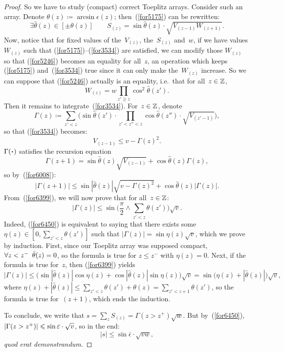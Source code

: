 \begin{proof}
So we have to study (compact) correct Toeplitz arrays.
Consider such an array.
Denote $\theta(z) \coloneqq \arcsin \epsilon(z)$;
then~(\ref{for5175}) can be rewritten:
\[\label{f7312} \exists \hat{\theta}(z) \in [\pm\theta(z)] \qquad
S_{(z)} = \sin \hat{\theta}(z) \cdot \sqrt{V_{(z-1)}W_{(z+1)}} .\]
%
Now, notice that for fixed values of the~$V_{(z)}$, the~$S_{(z)}$ and~$w$,
if we have values $W_{(z)}$ such that (\ref{for5175})--(\ref{for3534}) are satisfied,
we can modify those $W_{(z)}$ so that (\ref{for5246}) becomes an equality for all~$z$,
an operation which keeps (\ref{for5175}) and~(\ref{for3534}) true
since it can only make the~$W_{(z)}$ increase.
So we can suppose that (\ref{for5246}) actually is an equality,
i.e.\ that for all~$z\in\mathbb{Z}$,
\[\label{for5357} W_{(z)} = w \prod_{z'\geq z} \cos^2\hat{\theta}(z') .\]
%
Then it remains to integrate~(\ref{for3534}).
For~$z\in\mathbb{Z}$, denote
\[ \Gamma(z) \coloneqq \sum_{z'<z} \Big( \sin \hat{\theta}(z') \cdot
\prod_{z'<z''<z} \cos \hat{\theta}(z'') \cdot \sqrt{V_{(z'-1)}} \Big) ,\]
so that (\ref{for3534}) becomes:
\[\label{for6008} V_{(z-1)} \leq v - \Gamma(z)^2 .\]
$\Gamma(\Bcdot)$ satisfies the recursion equation
\[ \Gamma(z+1) = \sin\hat{\theta}(z) \sqrt{V_{(z-1)}} + \cos\hat{\theta}(z) \Gamma(z) ,\]
so by~(\ref{for6008}):
\[\label{for6399} |\Gamma(z+1)| \leq \sin |\hat{\theta}(z)| \sqrt{v-\Gamma(z)^2}
+ \cos\hat{\theta}(z) |\Gamma(z)| .\]
%
From~(\ref{for6399}), we will now prove that for all~$z\in\mathbb{Z}$:
\[\label{for6450} |\Gamma(z)| \leq
\sin \Big( \frac{\pi}{2} \wedge \sum_{z'<z} \theta(z') \Big) \sqrt{v} .\]
%
Indeed, (\ref{for6450}) is equivalent to saying that
there exists some $\eta(z) \in [0, \sum_{z'<z} \theta(z')]$
such that $|\Gamma(z)| = \sin\eta(z) \sqrt{v}$,
which we prove by induction.
First, since our Toeplitz array was supposed compact,
$\forall z<z^- \enskip \hat\theta(z) = 0$, so
the formula is true for $z\leq z^-$ with $\eta(z) = 0$.
Next, if the formula is true for~$z$, then (\ref{for6399}) yields
\[|\Gamma(z)| \leq \big( \sin|\hat{\theta}(z)| \cos\eta(z)
+ \cos|\hat{\theta}(z)| \sin \eta(z) \big) \sqrt{v}
= \sin\big( \eta(z) + |\hat{\theta}(z)| \big) \sqrt{v} ,\]
where $\eta(z) + |\hat{\theta}(z)| \leq \sum_{z'<z} \theta(z') + \theta(z)
= \sum_{z'<z+1} \theta(z')$, so the formula is true for~$(z+1)$,
which ends the induction.

To conclude, we write that $s = \sum_z S_{(z)} = \Gamma({z>z^+})\sqrt{w}$.
But by~(\ref{for6450}),
${|\Gamma(z > z^+)|} \ab \leq \sin\bar{\epsilon} \cdot \sqrt{v}$,
so in the end:
\[\label{for4760} |s| \leq \sin\bar{\epsilon} \cdot \sqrt{vw} ,\]
\emph{quod erat demonstrandum.}
\end{proof}


